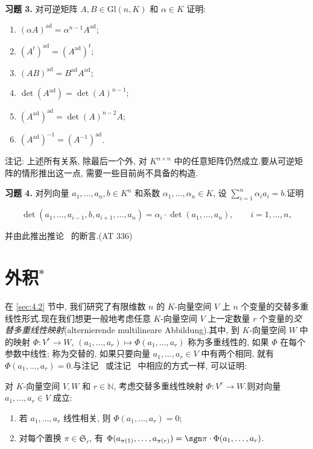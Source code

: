 \medskip
\noindent\textbf{习题 3.} 对可逆矩阵 $A, B \in \mathrm{Gl}(n, K)$ 和 $\alpha \in K$ 证明:
\begin{enumerate}
\item[(i)] $(\alpha A)^{\mathrm{ad}} = \alpha^{n-1} A^{\mathrm{ad}}$;
\item[(ii)] $(A^t)^{\mathrm{ad}} = (A^{\mathrm{ad}})^t$;
\item[(iii)] $(AB)^{\mathrm{ad}} = B^{\mathrm{ad}} A^{\mathrm{ad}}$;
\item[(iv)] $\det(A^{\mathrm{ad}}) = \det(A)^{n-1}$;
\item[(v)] $(A^{\mathrm{ad}})^{\mathrm{ad}} = \det(A)^{n-2} A$;
\item[(vi)] $(A^{\mathrm{ad}})^{-1} = (A^{-1})^{\mathrm{ad}}$.
\end{enumerate}

注记: 上述所有关系, 除最后一个外, 对 $K^{n \times n}$ 中的任意矩阵仍然成立.要从可逆矩阵的情形推出这一点, 需要一些目前尚不具备的构造.

\medskip
\noindent\textbf{习题 4.} 对列向量 $a_1, \ldots, a_n, b \in K^n$ 和系数 $\alpha_1, \ldots, \alpha_n \in K$, 设 $\sum_{i = 1}^{n} \alpha_i a_i = b$.证明

\[
\det(a_1, \ldots, a_{i-1}, b, a_{i+1}, \ldots, a_n) = \alpha_i \cdot \det(a_1, \ldots, a_n), \qquad i = 1, \ldots, n,
\]

并由此推出推论~ 的断言.(AT 336)

\section{\texorpdfstring{外积$^*$}{外积*}}\label{sec:4.5}

在 \ref{sec:4.2} 节中, 我们研究了有限维数 $n$ 的 $K$-向量空间 $V$ 上 $n$ 个变量的交替多重线性形式.现在我们想更一般地考虑任意 $K$-向量空间 $V$ 上一定数量 $r$ 个变量的\emph{交替多重线性映射}(\textup{alternierende multilineare Abbildung}).其中, 到 $K$-向量空间 $W$ 中的映射 $\Phi \colon V^r \longrightarrow W$, $(a_1, \ldots, a_r) \longmapsto \Phi(a_1, \ldots, a_r)$ 称为多重线性的, 如果 $\Phi$ 在每个参数中线性; 称为交替的, 如果只要向量 $a_1, \ldots, a_r \in V$ 中有两个相同, 就有 $\Phi(a_1, \ldots, a_r) = 0$.与注记~ 或注记~ 中相应的方式一样, 可以证明:

\begin{remark}\label{rem:4.5.1}
对 $K$-向量空间 $V, W$ 和 $r \in \mathbb{N}$, 考虑交替多重线性映射 $\Phi \colon V^r \longrightarrow W$.则对向量 $a_1, \ldots, a_r \in V$ 成立:
\begin{enumerate}
\item[(i)] 若 $a_1, \ldots, a_r$ 线性相关, 则 $\Phi(a_1, \ldots, a_r) = 0$;
\item[(ii)] 对每个置换 $\pi \in \mathfrak{S}_r$, 有 $\Phi(a_{\pi(1)}, \ldots, a_{\pi(r)}) = \sgn \pi \cdot \Phi(a_1, \ldots, a_r)$.
\end{enumerate}
\end{remark}

